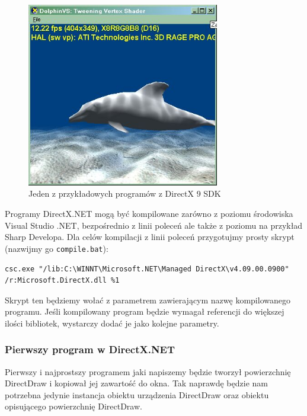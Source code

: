 \begin{figure}
\begin{center}
\includegraphics[width=0.75\textwidth]{./pic/dx0}
\caption{Jeden z przykładowych programów z DirectX 9 SDK}
\end{center}
\end{figure}

Programy DirectX.NET mogą być kompilowane zarówno z poziomu środowiska Visual Studio .NET, 
bezpośrednio z linii poleceń ale także z poziomu na przykład Sharp Developa. 
Dla celów kompilacji z linii poleceń przygotujmy prosty skrypt (nazwijmy go {\tt compile.bat}):

\begin{scriptsize}
\begin{verbatim}
csc.exe "/lib:C:\WINNT\Microsoft.NET\Managed DirectX\v4.09.00.0900" 
/r:Microsoft.DirectX.dll %1
\end{verbatim}
\end{scriptsize}

Skrypt ten będziemy wołać z parametrem zawierającym nazwę kompilowanego programu. 
Jeśli kompilowany program będzie wymagał referencji do większej ilości bibliotek, 
wystarczy dodać je jako kolejne parametry.

\subsubsection{Pierwszy program w DirectX.NET}

Pierwszy i najprostszy programem jaki napiszemy będzie tworzył powierzchnię DirectDraw i 
kopiował jej zawartość do okna. Tak naprawdę będzie nam potrzebna jedynie instancja 
obiektu urządzenia DirectDraw oraz obiektu opisującego powierzchnię DirectDraw.

